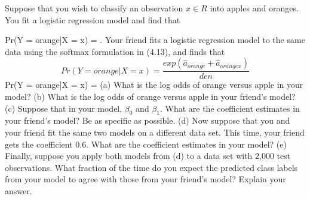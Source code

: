 	\begin{exercise}
	Suppose that you wish to classify an observation $x \in R $ into apples
	and oranges. You fit a logistic regression model and find that
	
	Pr(Y = orange|X = x) =
	.
	Your friend fits a logistic regression model to the same data using the
	softmax formulation in (4.13), and finds that
	$$Pr(Y= orange| X=x) = \frac{exp(\hat{a}_{orange} + \hat{a}_{orangex}) }{den}$$
	Pr(Y = orange|X = x) =
	(a) What is the log odds of orange versus apple in your model?
	(b) What is the log odds of orange versus apple in your friend’s
	model?
	(c) Suppose that in your model, $\beta_0$ and $\beta_1$. What are
	the coefficient estimates in your friend’s model? Be as specific
	as possible.
	(d) Now suppose that you and your friend fit the same two models
	on a different data set. This time, your friend gets the coefficient
	0.6. What are the coefficient estimates in your model?
	(e) Finally, suppose you apply both models from (d) to a data set
	with 2,000 test observations. What fraction of the time do you
	expect the predicted class labels from your model to agree with
	those from your friend’s model? Explain your answer. \\
	\end{exercise}


	
	
	
	\newpage